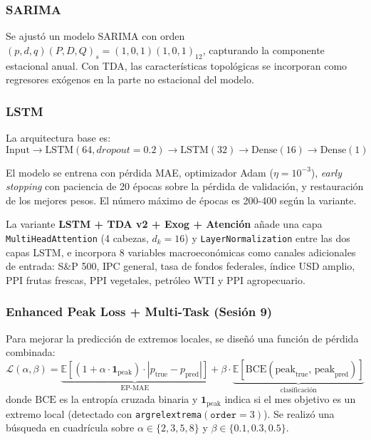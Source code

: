 \documentclass[12pt, a4paper]{article}
\begin{document}
\subsubsection{SARIMA}
Se ajustó un modelo SARIMA con orden $(p,d,q)(P,D,Q)_s = (1,0,1)(1,0,1)_{12}$, capturando
la componente estacional anual. Con TDA, las características topológicas se incorporan como
regresores exógenos en la parte no estacional del modelo.

\subsubsection{LSTM}
La arquitectura base es:
\begin{equation}
  \text{Input} \to \text{LSTM}(64, \textit{dropout}=0.2) \to \text{LSTM}(32) \to \text{Dense}(16) \to \text{Dense}(1)
\end{equation}

El modelo se entrena con pérdida MAE, optimizador Adam ($\eta = 10^{-3}$), \textit{early stopping}
con paciencia de 20 épocas sobre la pérdida de validación, y restauración de los mejores pesos.
El número máximo de épocas es 200-400 según la variante.

La variante \textbf{LSTM + TDA v2 + Exog + Atención} añade una capa \texttt{MultiHeadAttention}
(4 cabezas, $d_k = 16$) y \texttt{LayerNormalization} entre las dos capas LSTM, e incorpora
8 variables macroeconómicas como canales adicionales de entrada: S\&P 500, IPC general, tasa
de fondos federales, índice USD amplio, PPI frutas frescas, PPI vegetales, petróleo WTI y
PPI agropecuario.

\subsubsection{Enhanced Peak Loss + Multi-Task (Sesión 9)}
Para mejorar la predicción de extremos locales, se diseñó una función de pérdida combinada:
\begin{equation}
  \mathcal{L}(\alpha, \beta) = \underbrace{\mathbb{E}\left[(1 + \alpha \cdot \mathbf{1}_\mathrm{peak}) \cdot |p_\mathrm{true} - p_\mathrm{pred}|\right]}_{\text{EP-MAE}} + \beta \cdot \underbrace{\mathbb{E}\left[\mathrm{BCE}(\mathrm{peak}_\mathrm{true},\, \mathrm{peak}_\mathrm{pred})\right]}_{\text{clasificación}}
\end{equation}
donde $\mathrm{BCE}$ es la entropía cruzada binaria y $\mathbf{1}_\mathrm{peak}$ indica si el
mes objetivo es un extremo local (detectado con \texttt{argrelextrema}$(\mathtt{order}=3)$).
Se realizó una búsqueda en cuadrícula sobre $\alpha \in \{2,3,5,8\}$ y $\beta \in \{0.1, 0.3, 0.5\}$.
\end{document}
